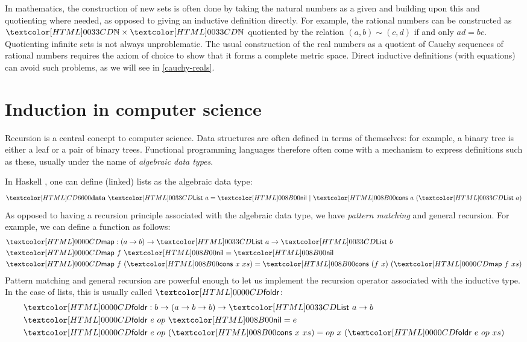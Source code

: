 In mathematics, the construction of new sets is often done by taking
the natural numbers as a given and building upon this and quotienting
where needed, as opposed to giving an inductive definition
directly. For example, the rational numbers can be constructed as
$\natty \times \natty$ quotiented by the relation
$(a , b) \sim (c , d)$ if and only $ad = bc$. Quotienting infinite
sets is not always unproblematic. The usual construction of the real
numbers as a quotient of Cauchy sequences of rational numbers requires
the axiom of choice to show that it forms a complete metric
space. Direct inductive definitions (with equations) can avoid such
problems, as we will see in \cref{cauchy-reals}.

\section{Induction in computer science}

Recursion is a central concept to computer science. Data structures
are often defined in terms of themselves: for example, a binary tree
is either a leaf or a pair of binary trees. Functional programming
languages therefore often come with a mechanism to express definitions
such as these, usually under the name of \emph{algebraic data types}.

In Haskell \cite{Jones2003}, one can define (linked) lists as the
algebraic data type:
$$
\data\ \List\ a = \listnil\ |\ \listcons\ a\ (\List\ a)
$$
As opposed to having a recursion principle associated with the
algebraic data type, we have \emph{pattern matching} and general
recursion. For example, we can define a function as follows:
%
\begin{align*}
  &\listmap : (a \to b) \to \List\ a \to \List\ b \\
  &\listmap\ f\ \listnil = \listnil \\
  &\listmap\ f\ (\listcons\ x\ xs) = \listcons\ (f\ x)\ (\listmap\ f\ xs)
\end{align*}
%
Pattern matching and general recursion are powerful enough to let us
implement the recursion operator associated with the inductive
type. In the case of lists, this is usually called $\listfoldr$:
%
\begin{align*}
  &\listfoldr : b \to (a \to b \to b) \to \List\ a \to b \\
  &\listfoldr\ e\ op\ \listnil = e \\
  &\listfoldr\ e\ op\ (\listcons\ x\ xs) = op\ x\ (\listfoldr\ e\ op\ xs)
\end{align*}
%

